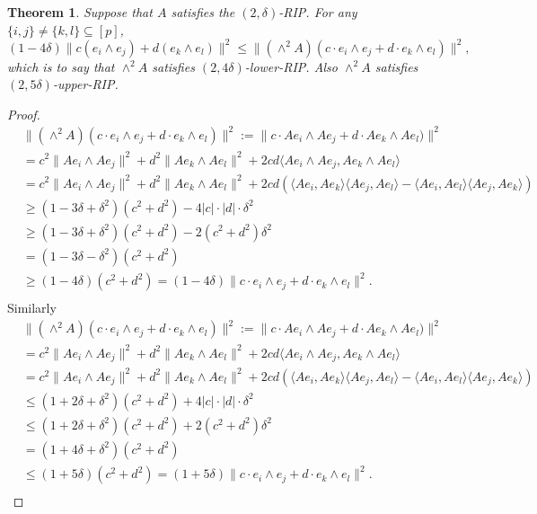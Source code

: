 \documentclass[11pt]{amsart}
\newtheorem{theorem}{Theorem}
\begin{document}
\begin{theorem}
Suppose that $A$ satisfies the $(2, \delta)$-RIP.
 For any $\{i,j\}\neq \{k,l\}\subseteq [p]$, \[(1-4\delta)\|c(e_i\wedge e_j) +d(e_k\wedge e_l)\|^2\leq \| (\wedge^2 A)(c\cdot e_i\wedge e_j +d \cdot e_k\wedge e_l)\|^2,\] which is to say that $\wedge^2 A$ satisfies $(2, 4\delta)$-lower-RIP. Also $\wedge^2 A$ satisfies $(2, 5\delta)$-upper-RIP.
\end{theorem}
\begin{proof}
\begin{align*}
  &\| (\wedge^2 A)(c\cdot e_i\wedge e_j +d \cdot e_k\wedge e_l)\|^2:= \| c\cdot Ae_i\wedge Ae_j +d \cdot Ae_k\wedge Ae_l)\|^2 \\
  &=c^2\| Ae_i\wedge Ae_j\|^2+ d^2\| Ae_k\wedge Ae_l\|^2 +2cd\langle Ae_i\wedge Ae_j, Ae_k\wedge Ae_l \rangle \\
   &=c^2\| Ae_i\wedge Ae_j\|^2+ d^2\| Ae_k\wedge Ae_l\|^2 
   +2cd(\langle Ae_i, Ae_k\rangle\langle Ae_j, Ae_l\rangle-\langle Ae_i,Ae_l\rangle\langle Ae_j,Ae_k \rangle )\\
  &\geq (1-3\delta+\delta^2)(c^2+d^2)-4|c|\cdot|d|\cdot \delta^2 \\
  &\geq (1-3\delta+\delta^2)(c^2+d^2)-2(c^2+d^2) \delta^2\\
  &=(1-3\delta-\delta^2)(c^2+d^2)\\
  &\geq (1-4\delta)(c^2+d^2)=(1-4\delta)\|c\cdot e_i\wedge e_j +d \cdot e_k\wedge e_l\|^2.\\
\end{align*}
Similarly
\begin{align*}
  &\| (\wedge^2 A)(c\cdot e_i\wedge e_j +d \cdot e_k\wedge e_l)\|^2:= \| c\cdot Ae_i\wedge Ae_j +d \cdot Ae_k\wedge Ae_l)\|^2 \\
  &=c^2\| Ae_i\wedge Ae_j\|^2+ d^2\| Ae_k\wedge Ae_l\|^2 +2cd\langle Ae_i\wedge Ae_j, Ae_k\wedge Ae_l \rangle \\
   &=c^2\| Ae_i\wedge Ae_j\|^2+ d^2\| Ae_k\wedge Ae_l\|^2 
   +2cd(\langle Ae_i, Ae_k\rangle\langle Ae_j, Ae_l\rangle-\langle Ae_i,Ae_l\rangle\langle Ae_j,Ae_k \rangle )\\
  &\leq (1+2\delta+\delta^2)(c^2+d^2)+4|c|\cdot|d|\cdot \delta^2 \\
  &\leq (1+2\delta+\delta^2)(c^2+d^2)+2(c^2+d^2) \delta^2\\
  &=(1+4\delta+\delta^2)(c^2+d^2)\\
  &\leq (1+5\delta)(c^2+d^2)=(1+5\delta)\|c\cdot e_i\wedge e_j +d \cdot e_k\wedge e_l\|^2.\\
\end{align*}
\end{proof}
\end{document}
